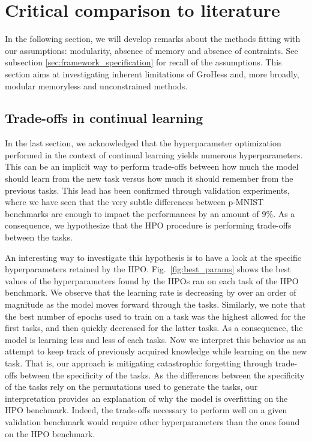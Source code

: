 \documentclass[11pt]{article}
\begin{document}
\section{Critical comparison to literature} \label{sec:interpretation}



In the following section, we will develop remarks about the methods fitting with our assumptions: modularity, absence of memory and absence of contraints. See subsection \ref{sec:framework_specification} for recall of the assumptions. This section aims at investigating inherent limitations of GroHess and, more broadly, modular memoryless and unconstrained methods. 


\subsection{Trade-offs in continual learning}


In the last section, we acknowledged that the hyperparameter optimization performed in the context of continual learning yields numerous hyperparameters. This can be an implicit way to perform trade-offs between how much the model should learn from the new task versus how much it should remember from the previous tasks. This lead has been confirmed through validation experiments, where we have seen that the very subtle differences between p-MNIST benchmarks are enough to impact the performances by an amount of $9\%$. As a consequence, we hypothesize that the HPO procedure is performing trade-offs between the tasks.

\vspace{2mm}
\noindent
An interesting way to investigate this hypothesis is to have a look at the specific hyperparameters retained by the HPO. Fig.~\ref{fig:best_params} shows the best values of the hyperparameters found by the HPOs ran on each task of the HPO benchmark. We observe that the learning rate is decreasing by over an order of magnitude as the model moves forward through the tasks. Similarly, we note that the best number of epochs used to train on a task was the highest allowed for the first tasks, and then quickly decreased for the latter tasks. As a consequence, the model is learning less and less of each tasks. Now we interpret this behavior as an attempt to keep track of previously acquired knowledge while learning on the new task. That is, our approach is mitigating catastrophic forgetting through trade-offs between the specificity of the tasks. As the differences between the specificity of the tasks rely on the permutations used to generate the tasks, our interpretation provides an explanation of why the model is overfitting on the HPO benchmark. Indeed, the trade-offs necessary to perform well on a given validation benchmark would require other hyperparameters than the ones found on the HPO benchmark.
\end{document}
